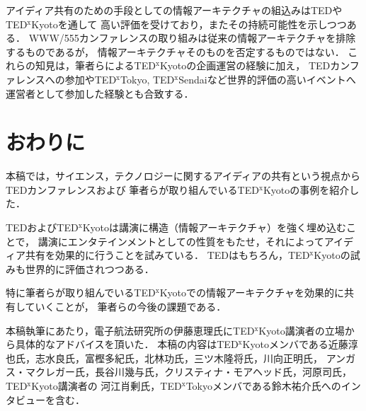 \documentclass[submit,techreq,jkeyword,noauthor]{ipsj}
\newcommand{\TED}{\textrm{TED}}
\newcommand{\TEDx}{\TED${}^{\textrm{x}}$}
\newcommand{\TEDxTokyo}{\TEDx\textrm{Tokyo}}
\newcommand{\TEDxKyoto}{\TEDx\textrm{Kyoto}}
\newcommand{\TEDxSendai}{\TEDx\textrm{Sendai}}
\begin{document}
アイディア共有のための手段としての情報アーキテクチャの組込みは\TED や\TEDxKyoto を通して
高い評価を受けており，またその持続可能性を示しつつある．
WWW/555カンファレンスの取り組みは従来の情報アーキテクチャを排除するものであるが，
情報アーキテクチャそのものを否定するものではない．
これらの知見は，筆者らによる\TEDxKyoto の企画運営の経験に加え，
\TED カンファレンスへの参加や\TEDxTokyo, \TEDxSendai など世界的評価の高いイベントへ
運営者として参加した経験とも合致する．



\section{おわりに}

本稿では，サイエンス，テクノロジーに関するアイディアの共有という視点から\TED カンファレンスおよび
筆者らが取り組んでいる\TEDxKyoto の事例を紹介した．

\TED および\TEDxKyoto は講演に構造（情報アーキテクチャ）を強く埋め込むことで，
講演にエンタテインメントとしての性質をもたせ，それによってアイディア共有を効果的に行うことを試みている．
\TED はもちろん，\TEDxKyoto の試みも世界的に評価されつつある．

特に筆者らが取り組んでいる\TEDxKyoto での情報アーキテクチャを効果的に共有していくことが，
筆者らの今後の課題である．

\begin{acknowledgment}
本稿執筆にあたり，電子航法研究所の伊藤恵理氏に\TEDxKyoto 講演者の立場から具体的なアドバイスを頂いた．
本稿の内容は\TEDxKyoto メンバである近藤淳也氏，志水良氏，富樫多紀氏，北林功氏，三ツ木隆将氏，川向正明氏，
アンガス・マクレガー氏，長谷川幾与氏，クリスティナ・モアヘッド氏，河原司氏，\TEDxKyoto 講演者の
河江肖剰氏，\TEDxTokyo メンバである鈴木祐介氏へのインタビューを含む．
\end{acknowledgment}
\end{document}
